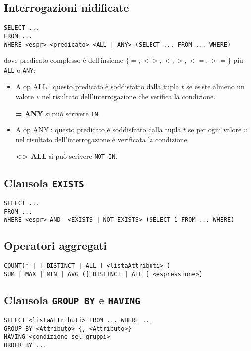 \documentclass[a4paper, 10pt]{article}
\theoremstyle{definition}
\begin{document}
		\subsection*{Interrogazioni nidificate}
		\begin{lstlisting}
SELECT ...
FROM ...
WHERE <espr> <predicato> <ALL | ANY> (SELECT ... FROM ... WHERE)
		\end{lstlisting}
		dove predicato complesso è dell'insieme $\{ =, <>, <, >, <=, >= \}$ più \lstinline|ALL| o \lstinline|ANY|:
		\begin{itemize}
			\item A op ALL : questo predicato è soddisfatto dalla tupla $t$ se esiste almeno un
			valore $v$ nel risultato dell'interrogazione che
			verifica la condizione.
			
			\textbf{= ANY} si può scrivere \lstinline|IN|.
			\item A op ANY : questo predicato è soddisfatto dalla tupla $t$ se per ogni valore $v$
			nel risultato dell'interrogazione è verificata la
			condizione
			
			\textbf{<> ALL} si può scrivere \lstinline|NOT IN|.
		\end{itemize}
		
		\subsection*{Clausola \lstinline|EXISTS|}
		\begin{lstlisting}
SELECT ...
FROM ...
WHERE <espr> AND  <EXISTS | NOT EXISTS> (SELECT 1 FROM ... WHERE)
		\end{lstlisting}
		
		\subsection*{Operatori aggregati}
		\begin{lstlisting}
COUNT(* | [ DISTINCT | ALL ] <listaAttributi> )
SUM | MAX | MIN | AVG ([ DISTINCT | ALL ] <espressione>)
		\end{lstlisting}
		
		\subsection*{Clausola \lstinline|GROUP BY| e \lstinline|HAVING|}
		\begin{lstlisting}
SELECT <listaAttributi> FROM ... WHERE ...
GROUP BY <Attributo> {, <Attributo>}
HAVING <condizione_sel_gruppi>
ORDER BY ...
		\end{lstlisting}
		
\end{document}
